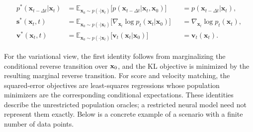 \begin{mdframed}
    \begin{align}\label{eq:three-minimizer-oracle}
\begin{aligned}
        p^*(\mathbf{x}_{t-\Delta t}|\mathbf{x}_t) &= \mathbb{E}_{\mathbf{x}_0 \sim p(\cdot|\mathbf{x}_t)} \big[p(\mathbf{x}_{t-\Delta t}|\mathbf{x}_t, \mathbf{x}_0)\big] &&= p(\mathbf{x}_{t-\Delta t}|\mathbf{x}_t), \\
    \mathbf{s}^*(\mathbf{x}_t, t) &= \mathbb{E}_{\mathbf{x}_0 \sim p(\cdot|\mathbf{x}_t)} \big[\nabla_{\mathbf{x}_t} \log p_t(\mathbf{x}_t|\mathbf{x}_0)\big] &&= \nabla_{\mathbf{x}_t} \log p_t(\mathbf{x}_t), \\
    \mathbf{v}^*(\mathbf{x}_t, t) &= \mathbb{E}_{\mathbf{x}_0 \sim p(\cdot|\mathbf{x}_t)} \big[\mathbf{v}_t(\mathbf{x}_t|\mathbf{x}_0)\big] &&= \mathbf{v}_t(\mathbf{x}_t).
\end{aligned}
\end{align}
\end{mdframed}

For the variational view, the first identity follows from marginalizing the
conditional reverse transition over ${\mathbf{x}}_0$, and the KL objective is minimized
by the resulting marginal reverse transition. For score and velocity matching,
the squared-error objectives are least-squares regressions whose population
minimizers are the corresponding conditional expectations. These identities
describe the unrestricted population oracles; a restricted neural model need
not represent them exactly. Below is a concrete example of a scenario with a finite number of data points.


